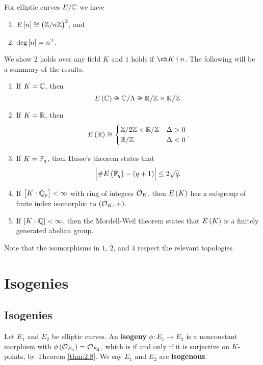 For elliptic curves $ E / \mathbb{C} $ we have
\begin{enumerate}
\item $ E\sbr{n} \cong \br{\ZZ / n\ZZ}^2 $, and
\item $ \deg \sbr{n} = n^2 $.
\end{enumerate}
We show $ 2 $ holds over any field $ K $ and $ 1 $ holds if $ \ch K \nmid n $. The following will be a summary of the results.
\begin{enumerate}
\item If $ K = \mathbb{C} $, then
$$ E\br{\CC} \cong \CC / \Lambda \cong \RR / \ZZ \times \RR / \ZZ. $$
\item If $ K = \mathbb{R} $, then
$$ E\br{\RR} \cong
\begin{cases}
\ZZ / 2\ZZ \times \RR / \ZZ & \Delta > 0 \\
\RR / \ZZ & \Delta < 0
\end{cases}.
$$
\item If $ K = \mathbb{F}_q $, then Hasse's theorem states that
$$ \abs{\#E\br{\FF_q} - \br{q + 1}} \le 2\sqrt{q}. $$
\item If $ \sbr{K : \QQ_p} < \infty $ with ring of integers $ \mathcal{O}_K $, then $ E\br{K} $ has a subgroup of finite index isomorphic to $ \br{\OOO_K, +} $.
\item If $ \sbr{K : \QQ} < \infty $, then the Mordell-Weil theorem states that $ E\br{K} $ is a finitely generated abelian group.
\end{enumerate}
Note that the isomorphisms in $ 1 $, $ 2 $, and $ 4 $ respect the relevant topologies.

\pagebreak

\section{Isogenies}

\subsection{Isogenies}


\begin{definition*}
Let $ E_1 $ and $ E_2 $ be elliptic curves. An \textbf{isogeny} $ \phi : E_1 \to E_2 $ is a nonconstant morphism with $ \phi\br{\OOO_{E_1}} = \OOO_{E_2} $, which is if and only if it is surjective on $ \overline{K} $-points, by Theorem \ref{thm:2.8}. We say $ E_1 $ and $ E_2 $ are \textbf{isogenous}.
\end{definition*}

